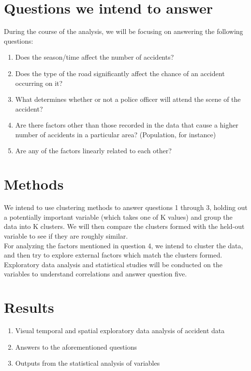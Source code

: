 \documentclass[a4paper, 11pt]{article}
\begin{document}
   \section{Questions we intend to answer}
   During the course of the analysis, we will be focusing on answering the following questions:
   \begin{enumerate}
     \item Does the season/time affect the number of accidents?
     \item Does the type of the road significantly affect the chance of an accident occurring on it?
     \item What determines whether or not a police officer will attend the scene of the accident?
     \item Are there factors other than those recorded in the data that cause a higher number of accidents in a particular area? (Population, for instance)
     \item Are any of the factors linearly related to each other?
   \end{enumerate}

   \section{Methods}
   
   We intend to use clustering methods to answer questions 1 through 3, holding out a potentially important variable (which takes one of K values) and group the data into K clusters. We will then compare the clusters formed with the held-out variable to see if they are roughly similar. \\
   For analyzing the factors mentioned in question 4, we intend to cluster the data, and then try to explore external factors which match the clusters formed. \\
   Exploratory data analysis and statistical studies will be conducted on the variables to understand correlations and answer question five.  
   

   \section{Results}
   \begin{enumerate}
   \item Visual temporal and spatial exploratory data analysis of accident data
   \item Answers to the aforementioned questions
   \item  Outputs from the statistical analysis of variables
   \end{enumerate}
\end{document}
